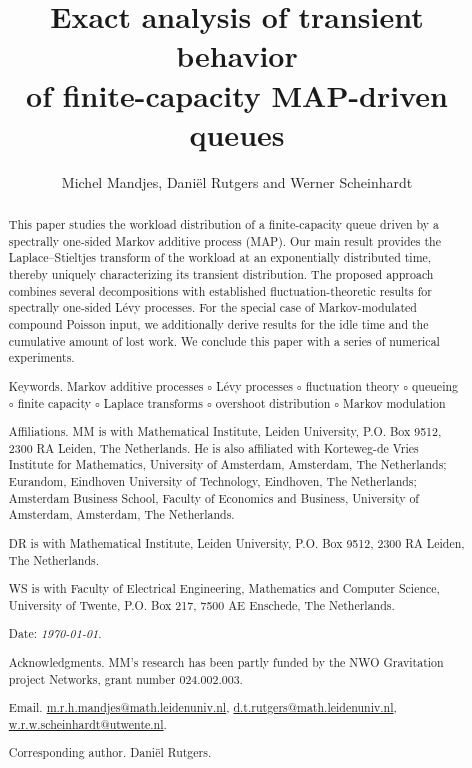 \documentclass[reqno,12pt]{amsart}
\newcommand{\vb}{\vspace{3.2mm}}
\begin{document}
	
	
	
	\title[Finite-capacity MAP-driven queues]{Exact analysis of transient behavior\\ of finite-capacity MAP-driven queues}
\author[M. Mandjes, D. Rutgers, {\tiny and} W. Scheinhardt]{Michel Mandjes, Dani\"el Rutgers {\tiny and} Werner Scheinhardt}
	
	\begin{abstract} This paper studies the workload distribution of a finite-capacity queue driven by a spectrally one-sided Markov additive process (MAP). Our main result provides the Laplace–Stieltjes transform of the workload at an exponentially distributed time, thereby uniquely characterizing its transient distribution. The proposed approach combines several decompositions with established fluctuation-theoretic results for spectrally one-sided L\'evy processes. For the special case of Markov-modulated compound Poisson input, we additionally derive results for the idle time and the cumulative amount of lost work. We conclude this paper with a series of numerical experiments.
		 

  
\vb

\noindent
{\sc Keywords.} Markov additive processes $\circ$ L\'evy processes $\circ$ fluctuation theory $\circ$ queueing $\circ$ finite capacity $\circ$ Laplace transforms $\circ$ overshoot distribution $\circ$ Markov modulation

\vb

\noindent
{\sc Affiliations.} 
MM is with Mathematical Institute, Leiden University, P.O. Box 9512,
2300 RA Leiden,
The Netherlands. He is also affiliated with Korteweg-de Vries Institute for Mathematics, University of Amsterdam, Amsterdam, The Netherlands; E{\sc urandom}, Eindhoven University of Technology, Eindhoven, The Netherlands; Amsterdam Business School, Faculty of Economics and Business, University of Amsterdam, Amsterdam, The Netherlands. 

\noindent
DR is with Mathematical Institute, Leiden University, P.O. Box 9512,
2300 RA Leiden,
The Netherlands. 

\noindent
WS is with Faculty of Electrical Engineering, Mathematics and Computer Science, University of Twente, 
P.O. Box 217, 7500 AE  Enschede, The Netherlands.

\noindent Date: {\it \today}.

\vb

\noindent
{\sc Acknowledgments.} 
MM's research has been partly funded by the NWO Gravitation project N{\sc etworks}, grant number 024.002.003.


\vb

\noindent
{\sc Email.} {\scriptsize \url{m.r.h.mandjes@math.leidenuniv.nl}, \url{d.t.rutgers@math.leidenuniv.nl}, \url{w.r.w.scheinhardt@utwente.nl}}.

\vb

\noindent
{\sc Corresponding author.} Dani\"el Rutgers. 


		
		
	\end{abstract}
	
\end{document}
